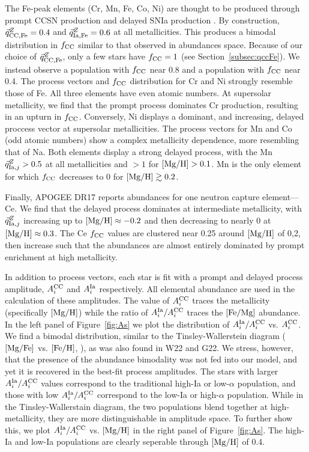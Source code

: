 \documentclass[modern]{aastex631}
\newcommand{\mgfe}[0]{[{\rm Mg/Fe}]}
\newcommand{\femg}{[{\rm Fe}/{\rm Mg}]}
\newcommand{\mgh}{[{\rm Mg}/{\rm H}]}
\newcommand{\feh}[0]{[{\rm Fe/H}]}
\newcommand{\qccFe}{\vec{q}_{{\rm CC, Fe}}^{Z}}
\newcommand{\qIa}{\vec{q}_{{\rm Ia,}j}^{Z}}
\newcommand{\qIaFe}{\vec{q}_{{\rm Ia,Fe}}^{Z}}
\newcommand{\Acc}{A^{\rm CC}_{i}}
\newcommand{\AIa}{A^{\rm Ia}_{i}}
\newcommand{\fcc}{f_{\rm CC}}
\begin{document}
The Fe-peak elements (Cr, Mn, Fe, Co, Ni) are thought to be produced through prompt CCSN production and delayed SNIa production \citep[e.g.][]{andrews2017}. By construction, $\qccFe=0.4$ and $\qIaFe=0.6$ at all metallicities. This produces a bimodal distribution in $\fcc$ similar to that observed in abundances space. Because of our choice of $\qccFe$, only a few stars have $\fcc=1$ (see Section~\ref{subsec:qccFe}). We instead observe a population with $\fcc$ near 0.8 and a population with $\fcc$ near 0.4. The process vectors and $\fcc$ distribution for Cr and Ni strongly resemble those of Fe. All three elements have even atomic numbers. At supersolar metallicity, we find that the prompt process dominates Cr production, resulting in an upturn in $\fcc$. Conversely, Ni displays a dominant, and increasing, delayed proccess vector at supersolar metallicities. The process vectors for Mn and Co (odd atomic numbers) show a complex metallicity dependence, more resembling that of Na. Both elements display a strong delayed process, with the Mn $\qIa > 0.5$ at all metallicities and $> 1$ for $\mgh > 0.1$. Mn is the only element for which $\fcc$ decreases to 0 for $\mgh \gtrsim 0.2$. 

Finally, APOGEE DR17 reports abundances for one neutron capture element---Ce. We find that the delayed process dominates at intermediate metallicity, with $\qIa$ increasing up to $\mgh \approx -0.2$ and then decreasing to nearly 0 at $\mgh \approx 0.3$. The Ce $\fcc$ values are clustered near 0.25 around $\mgh$ of 0,2, then increase such that the abundances are almost entirely dominated by prompt enrichment at high metallicity.

In addition to process vectors, each star is fit with a prompt and delayed process amplitude, $\Acc$ and $\AIa$ respectively. All elemental abundance are used in the calculation of these amplitudes. The value of $\Acc$ traces the metallicity (specifically $\mgh$) while the ratio of $\AIa/\Acc$ traces the $\femg$ abundance. In the left panel of Figure~\ref{fig:As} we plot the distribution of $\AIa/\Acc$ vs. $\Acc$. We find a bimodal distribution, similar to the Tinsley-Wallerstein diagram ($\mgfe$ vs. $\feh$, \citealp{wallerstein1962, tinsley1979, tinsley1980}), as was also found in W22 and G22. We stress, however, that the presence of the abundance bimodality was not fed into our model, and yet it is recovered in the best-fit process amplitudes. The stars with larger $\AIa/\Acc$ values correspond to the traditional high-Ia or low-$\alpha$ population, and those with low $\AIa/\Acc$ correspond to the low-Ia or high-$\alpha$ population. While in the Tinsley-Wallerstain diagram, the two populations blend together at high-metallicity, they are more distinguishable in amplitude space. To further show this, we plot $\AIa/\Acc$ vs. $\mgh$ in the right panel of Figure~\ref{fig:As}. The high-Ia and low-Ia populations are clearly seperable through $\mgh$ of 0.4.
\end{document}
